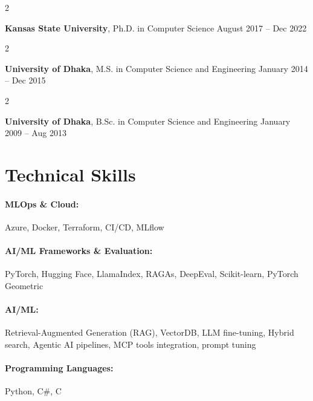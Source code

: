 \documentclass[10pt, letterpaper]{article}
\newenvironment{twocolentry}[2][]{
    \onecolentry
    \def\secondColumn{#2}
    \setcolumnwidth{\fill, 4.5 cm}
    \begin{paracol}{2}
}{
    \switchcolumn \raggedleft \secondColumn
    \end{paracol}
    \endonecolentry
} %
\begin{document}
        \begin{twocolentry}{
            August 2017 -- Dec 2022
        }
            \textbf{Kansas State University}, Ph.D. in Computer Science\end{twocolentry}

        \begin{twocolentry}{
            January 2014 -- Dec 2015
        }
            \textbf{University of Dhaka}, M.S. in Computer Science and Engineering\end{twocolentry}

        \begin{twocolentry}{
            January 2009 -- Aug 2013
        }
            \textbf{University of Dhaka}, B.Sc. in Computer Science and Engineering\end{twocolentry}

\vspace{-1mm}
\section{Technical Skills}

        \paragraph{MLOps \& Cloud:} Azure, Docker, Terraform, CI/CD, MLflow
        \vspace{-4mm}
        \paragraph{AI/ML Frameworks \& Evaluation:} PyTorch, Hugging Face, LlamaIndex, RAGAs, DeepEval, Scikit-learn, PyTorch Geometric
        \vspace{-4mm}
        \paragraph{AI/ML:} Retrieval-Augmented Generation (RAG), VectorDB, LLM fine-tuning, Hybrid search, Agentic AI pipelines, MCP tools integration, prompt tuning
        \vspace{-4mm}
        \paragraph{Programming Languages:} Python, C\#, C
\end{document}
